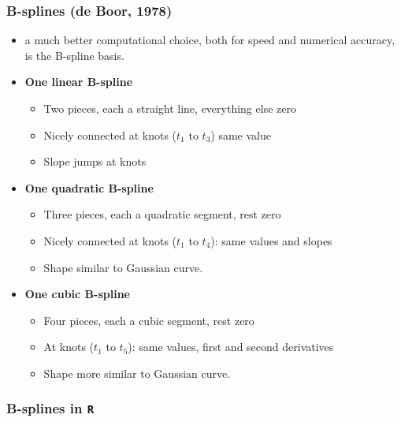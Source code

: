 \documentclass[11pt]{beamer}
\newcommand{\nologo}{\setbeamertemplate{logo}{}}
\begin{document}
{\nologo
\begin{frame}
 \frametitle{B-splines (de Boor, 1978)}
 \vspace{-.20cm}
{\footnotesize
\begin{itemize}%
\item a much better computational choice, both for speed and numerical accuracy, is the B-spline
basis.
\item {\bf One linear B-spline} 
 \begin{itemize}
  \item Two pieces, each a straight line, everything else zero
  \item Nicely connected at knots ($t_1$ to $t_3$) same value
  \item Slope jumps at knots
 \end{itemize}
\item {\bf One quadratic B-spline} 
 \begin{itemize}
  \item Three pieces, each a quadratic segment, rest zero
  \item Nicely connected at knots ($t_1$ to $t_4$): same values and slopes
  \item Shape similar to Gaussian curve.
 \end{itemize}
\item {\bf One cubic B-spline} 
 \begin{itemize}
  \item Four pieces, each a cubic segment, rest zero
  \item At knots ($t_1$ to $t_5$): same values, first and second derivatives
  \item Shape more similar to Gaussian curve.
 \end{itemize}
\end{itemize}
}
\vfill

\vfill

\end{frame}
}


\begin{frame}[fragile]
  \frametitle{B-splines in \texttt{R}}

\centering
\begin{Schunk}
\end{Schunk}
\end{frame}
\end{document}
